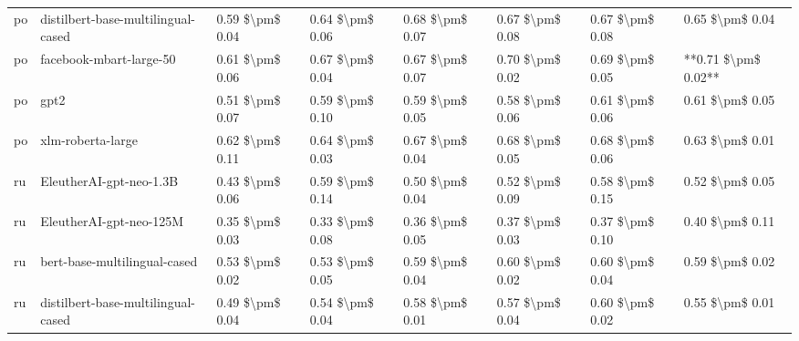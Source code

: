\begin{tabular}{llllllll}
      po & distilbert-base-multilingual-cased & 0.59 \$\textbackslash pm\$ 0.04 &           0.64 \$\textbackslash pm\$ 0.06 &       0.68 \$\textbackslash pm\$ 0.07 &        0.67 \$\textbackslash pm\$ 0.08 &                         0.67 \$\textbackslash pm\$ 0.08 &     0.65 \$\textbackslash pm\$ 0.04 \\
      po &            facebook-mbart-large-50 & 0.61 \$\textbackslash pm\$ 0.06 &           0.67 \$\textbackslash pm\$ 0.04 &       0.67 \$\textbackslash pm\$ 0.07 &        0.70 \$\textbackslash pm\$ 0.02 &                         0.69 \$\textbackslash pm\$ 0.05 & **0.71 \$\textbackslash pm\$ 0.02** \\
      po &                               gpt2 & 0.51 \$\textbackslash pm\$ 0.07 &           0.59 \$\textbackslash pm\$ 0.10 &       0.59 \$\textbackslash pm\$ 0.05 &        0.58 \$\textbackslash pm\$ 0.06 &                         0.61 \$\textbackslash pm\$ 0.06 &     0.61 \$\textbackslash pm\$ 0.05 \\
      po &                  xlm-roberta-large & 0.62 \$\textbackslash pm\$ 0.11 &           0.64 \$\textbackslash pm\$ 0.03 &       0.67 \$\textbackslash pm\$ 0.04 &        0.68 \$\textbackslash pm\$ 0.05 &                         0.68 \$\textbackslash pm\$ 0.06 &     0.63 \$\textbackslash pm\$ 0.01 \\
      ru &            EleutherAI-gpt-neo-1.3B & 0.43 \$\textbackslash pm\$ 0.06 &           0.59 \$\textbackslash pm\$ 0.14 &       0.50 \$\textbackslash pm\$ 0.04 &        0.52 \$\textbackslash pm\$ 0.09 &                         0.58 \$\textbackslash pm\$ 0.15 &     0.52 \$\textbackslash pm\$ 0.05 \\
      ru &            EleutherAI-gpt-neo-125M & 0.35 \$\textbackslash pm\$ 0.03 &           0.33 \$\textbackslash pm\$ 0.08 &       0.36 \$\textbackslash pm\$ 0.05 &        0.37 \$\textbackslash pm\$ 0.03 &                         0.37 \$\textbackslash pm\$ 0.10 &     0.40 \$\textbackslash pm\$ 0.11 \\
      ru &       bert-base-multilingual-cased & 0.53 \$\textbackslash pm\$ 0.02 &           0.53 \$\textbackslash pm\$ 0.05 &       0.59 \$\textbackslash pm\$ 0.04 &        0.60 \$\textbackslash pm\$ 0.02 &                         0.60 \$\textbackslash pm\$ 0.04 &     0.59 \$\textbackslash pm\$ 0.02 \\
      ru & distilbert-base-multilingual-cased & 0.49 \$\textbackslash pm\$ 0.04 &           0.54 \$\textbackslash pm\$ 0.04 &       0.58 \$\textbackslash pm\$ 0.01 &        0.57 \$\textbackslash pm\$ 0.04 &                         0.60 \$\textbackslash pm\$ 0.02 &     0.55 \$\textbackslash pm\$ 0.01 \\

\end{tabular}
